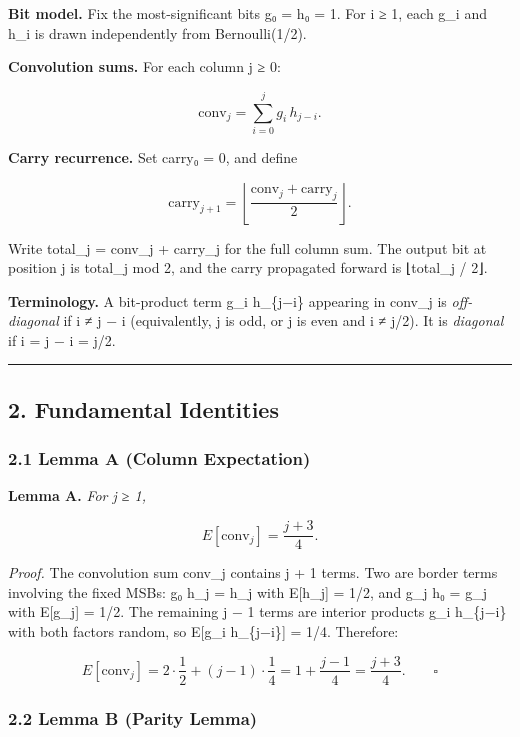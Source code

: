 \documentclass[
  11pt,
]{article}
\begin{document}
\textbf{Bit model.} Fix the most-significant bits g₀ = h₀ = 1. For i ≥ 1, each
g\_i and h\_i is drawn independently from Bernoulli(1/2).

\textbf{Convolution sums.} For each column j ≥ 0:

\[\text{conv}_j = \sum_{i=0}^{j} g_i \, h_{j-i}.\]

\textbf{Carry recurrence.} Set carry₀ = 0, and define

\[\text{carry}_{j+1} = \left\lfloor \frac{\text{conv}_j + \text{carry}_j}{2} \right\rfloor.\]

Write total\_j = conv\_j + carry\_j for the full column sum. The output bit at
position j is total\_j mod 2, and the carry propagated forward is ⌊total\_j /
2⌋.

\textbf{Terminology.} A bit-product term g\_i h\_\{j−i\} appearing in conv\_j is
\emph{off-diagonal} if i ≠ j − i (equivalently, j is odd, or j is even and i ≠
j/2). It is \emph{diagonal} if i = j − i = j/2.

\begin{center}\rule{0.5\linewidth}{0.5pt}\end{center}

\newpage

\subsection{2. Fundamental Identities}\label{fundamental-identities}

\subsubsection{2.1 Lemma A (Column
Expectation)}\label{lemma-a-column-expectation}

\textbf{Lemma A.} \emph{For j ≥ 1,}

\[E[\text{conv}_j] = \frac{j+3}{4}.\]

\emph{Proof.} The convolution sum conv\_j contains j + 1 terms. Two are border
terms involving the fixed MSBs: g₀ h\_j = h\_j with E{[}h\_j{]} = 1/2, and g\_j
h₀ = g\_j with E{[}g\_j{]} = 1/2. The remaining j − 1 terms are interior
products g\_i h\_\{j−i\} with both factors random, so E{[}g\_i h\_\{j−i\}{]} =
1/4. Therefore:

\[E[\text{conv}_j] = 2 \cdot \frac{1}{2} + (j-1) \cdot \frac{1}{4} = 1 + \frac{j-1}{4} = \frac{j+3}{4}. \qquad \square\]

\subsubsection{2.2 Lemma B (Parity Lemma)}\label{lemma-b-parity-lemma}
\end{document}
